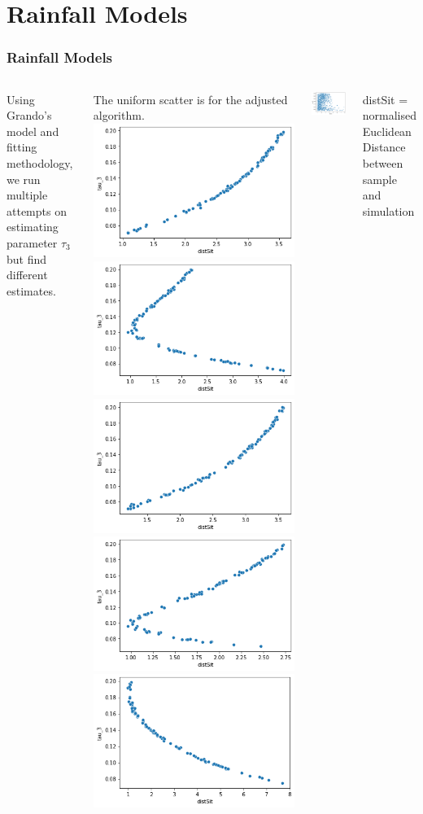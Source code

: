 \documentclass{beamer}
\begin{document}
    \section{Rainfall Models}
    \begin{frame}
    \frametitle{Rainfall Models}
        \begin{columns}
            Using Grando's model and fitting methodology, we run multiple attempts on estimating parameter $\tau_3$ but find different estimates.

            The uniform scatter is for the adjusted algorithm.
            \centering
            \includegraphics[width=0.3\linewidth]{./SingleParam/tau_3_1.png}
            \includegraphics[width=0.3\linewidth]{./SingleParam/tau_3_2.png}
            \includegraphics[width=0.3\linewidth]{./SingleParam/tau_3_3.png}
            \includegraphics[width=0.3\linewidth]{./SingleParam/tau_3_4.png}
            \includegraphics[width=0.3\linewidth]{./SingleParam/tau_3_5.png}

            
            \includegraphics[width=0.3\linewidth]{./Adj_ABC/tau_3.png}
            
            \scriptsize{distSit = normalised Euclidean Distance between sample and simulation}
        \end{columns}
    \end{frame}
    
\end{document}
